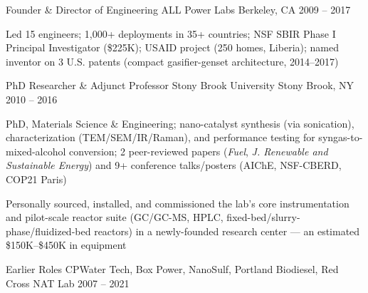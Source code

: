\begin{cventries}
  \cventry
    {Founder \& Director of Engineering}
    {ALL Power Labs}
    {Berkeley, CA}
    {2009 -- 2017}
    {
      \begin{cvitems}
        \item {Led 15 engineers; 1,000+ deployments in 35+ countries; NSF SBIR Phase I Principal Investigator (\$225K); USAID project (250 homes, Liberia); named inventor on 3 U.S. patents (compact gasifier-genset architecture, 2014--2017)}
      \end{cvitems}
    }

  \cventry
    {PhD Researcher \& Adjunct Professor}
    {Stony Brook University}
    {Stony Brook, NY}
    {2010 -- 2016}
    {
      \begin{cvitems}
        \item {PhD, Materials Science \& Engineering; nano-catalyst synthesis (via sonication), characterization (TEM/SEM/IR/Raman), and performance testing for syngas-to-mixed-alcohol conversion; 2 peer-reviewed papers (\textit{Fuel}, \textit{J. Renewable and Sustainable Energy}) and 9+ conference talks/posters (AIChE, NSF-CBERD, COP21 Paris)}
        \item {Personally sourced, installed, and commissioned the lab's core instrumentation and pilot-scale reactor suite (GC/GC-MS, HPLC, fixed-bed/slurry-phase/fluidized-bed reactors) in a newly-founded research center — an estimated \$150K--\$450K in equipment}
      \end{cvitems}
    }

  \cventry
    {Earlier Roles}
    {CPWater Tech, Box Power, NanoSulf, Portland Biodiesel, Red Cross NAT Lab}
    {}
    {2007 -- 2021}
    {}

\end{cventries}
